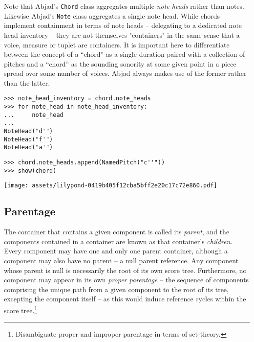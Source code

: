 \noindent Note that Abjad's \texttt{Chord} class aggregates multiple \emph{note
heads} rather than notes. Likewise Abjad's \texttt{Note} class aggregates a
single note head. While chords implement containment in terms of note heads --
delegating to a dedicated note head inventory -- they are not themselves
"containers" in the same sense that a voice, measure or tuplet are containers.
It is important here to differentiate between the concept of a \enquote{chord}
as a single duration paired with a collection of pitches and a \enquote{chord}
as the sounding sonority at some given point in a piece spread over some number
of voices. Abjad always makes use of the former rather than the latter.

\begin{comment}
<abjad>
note_head_inventory = chord.note_heads
for note_head in note_head_inventory:
    note_head

chord.note_heads.append(NamedPitch("c''"))
show(chord)
</abjad>
\end{comment}

\begin{abjadbookoutput}
\begin{singlespacing}
\vspace{-0.5\baselineskip}
\begin{lstlisting}
>>> note_head_inventory = chord.note_heads
>>> for note_head in note_head_inventory:
...     note_head
...
NoteHead("d'")
NoteHead("f'")
NoteHead("a'")
\end{lstlisting}
\begin{lstlisting}
>>> chord.note_heads.append(NamedPitch("c''"))
>>> show(chord)
\end{lstlisting}
\noindent\texttt{[image: assets/lilypond-0419b405f12cba5bff2e20c17c72e860.pdf]}
\end{singlespacing}
\end{abjadbookoutput}

\subsection{Parentage}
\label{ssec:parentage}

The container that contains a given component is called its \emph{parent}, and
the components contained in a container are known as that container's
\emph{children}. Every component may have one and only one parent container,
although a component may also have no parent -- a null parent reference. Any
component whose parent is null is necessarily the root of its own score tree.
Furthermore, no component may appear in its own \emph{proper parentage} -- the
sequence of components comprising the unique path from a given component to the
root of its tree, excepting the component itself -- as this would induce
reference cycles within the score tree.\footnote{Disambiguate proper and
improper parentage in terms of set-theory.}

